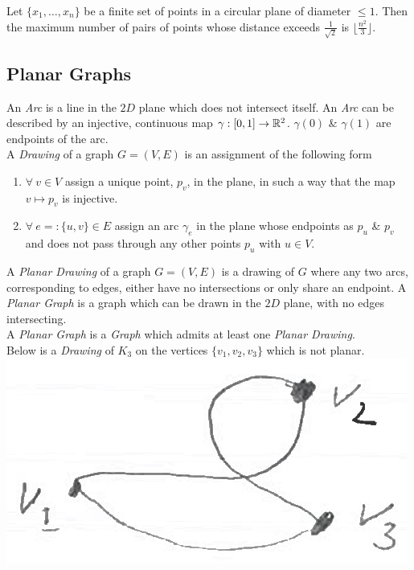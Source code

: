 \documentclass[11pt,a4paper]{article}
\begin{document}
Let $\{x_1,\dots,x_n\}$ be a finite set of points in a circular plane of diameter $\leq 1$. Then the maximum number of pairs of points whose distance exceeds $\frac{1}{\sqrt{2}}$ is $\lfloor\frac{n^2}{3}\rfloor$.

\subsection{Planar Graphs}

An \textit{Arc} is a line in the $2D$ plane which does not intersect itself.
An \textit{Arc} can be described by an injective, continuous map $\gamma:[0,1]\to\mathbb{R}^2$. $\gamma(0)$ \& $\gamma(1)$ are endpoints of the arc.\\

A \textit{Drawing} of a graph $G=(V,E)$ is an assignment of the following form
\begin{enumerate}[label=\roman*)]
	\item $\forall\ v\in V$ assign a unique point, $p_v$, in the plane, in such a way that the map $v\mapsto p_v$ is injective.
	\item $\forall\ e=:\{u,v\}\in E$ assign an arc $\gamma_e$ in the plane whose endpoints as $p_u$ \& $p_v$ and does not pass through any other points $p_u$ with $u\in V$.\\
\end{enumerate}

A \textit{Planar Drawing} of a graph $G=(V,E)$ is a drawing of $G$ where any two arcs, corresponding to edges, either have no intersections or only share an endpoint. A \textit{Planar Graph} is a graph which can be drawn in the $2D$ plane, with no edges intersecting.\\

A \textit{Planar Graph} is a \textit{Graph} which admits at least one \textit{Planar Drawing}.\\

Below is a \textit{Drawing} of $K_3$ on the vertices $\{v_1,v_2,v_3\}$ which is not planar.\\
\includegraphics[scale=0.3]{img/nonPlanarDrawing.png}
\end{document}
